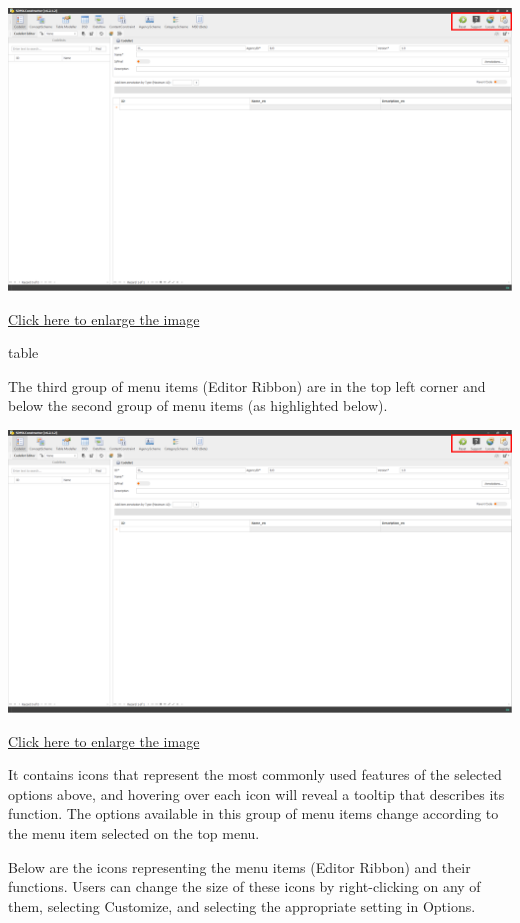 \documentclass[
]{book}
\theoremstyle{definition}
\theoremstyle{definition}
\theoremstyle{definition}
\theoremstyle{definition}
\theoremstyle{remark}
\begin{document}
\begin{center}\includegraphics[width=1\linewidth]{./images/image011} \end{center}

\href{images/image013.png}{Click here to enlarge the image}

table

The third group of menu items (Editor Ribbon) are in the top left corner and below the second group of menu items (as highlighted below).

\begin{center}\includegraphics[width=1\linewidth]{./images/image011} \end{center}

\href{images/image015.png}{Click here to enlarge the image}

It contains icons that represent the most commonly used features of the selected options above, and hovering over each icon will reveal a tooltip that describes its function. The options available in this group of menu items change according to the menu item selected on the top menu.

Below are the icons representing the menu items (Editor Ribbon) and their functions. Users can change the size of these icons by right-clicking on any of them, selecting Customize, and selecting the appropriate setting in Options.
\end{document}
